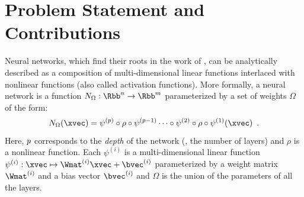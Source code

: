 \section{Problem Statement and Contributions}
\label{section:ch1-problem_statement_and_contributions}



Neural networks, which find their roots in the work of \citet{mcculloch1943logical,rosenblatt1958perceptron}, can be analytically described as a composition of multi-dimensional linear functions interlaced with nonlinear functions (also called activation functions).
More formally, a neural network is a function $N_{\Omega} : \Rbb^n \rightarrow \Rbb^m$ parameterized by a set of weights $\Omega$ of the form:
\begin{equation} \label{equation:ch1-neural_network}
  N_{\Omega}(\xvec) = \psi^{(\depth)} \circ \rho \circ \psi^{(\depth-1)} \cdots \circ \psi^{(2)} \circ \rho \circ \psi^{(1)} (\xvec) \enspace.
\end{equation}
Here, $p$ corresponds to the \emph{depth} of the network (\ie, the number of layers) and $\rho$ is a nonlinear function.
Each $\psi^{(i)}$ is a multi-dimensional linear function $\psi^{(i)}: \xvec \mapsto \Wmat^{(i)} \xvec + \bvec^{(i)}$ parameterized by a weight matrix $\Wmat^{(i)}$ and a bias vector $\bvec^{(i)}$ and $\Omega$ is the union of the parameters of all the layers.


